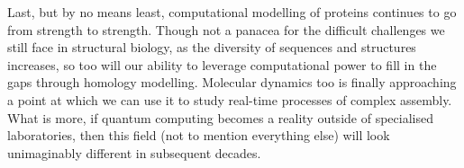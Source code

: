 \documentclass[a4paper,11pt,twoside,openright]{scrbook}
\begin{document}
Last, but by no means least, computational modelling of proteins continues to go from strength to strength. Though not a panacea for the difficult challenges we still face in structural biology, as the diversity of sequences and structures increases, so too will our ability to leverage computational power to fill in the gaps through homology modelling. Molecular dynamics too is finally approaching a point at which we can use it to study real-time processes of complex assembly. What is more, if quantum computing becomes a reality outside of specialised laboratories, then this field (not to mention everything else) will look unimaginably different in subsequent decades.

\end{document}
